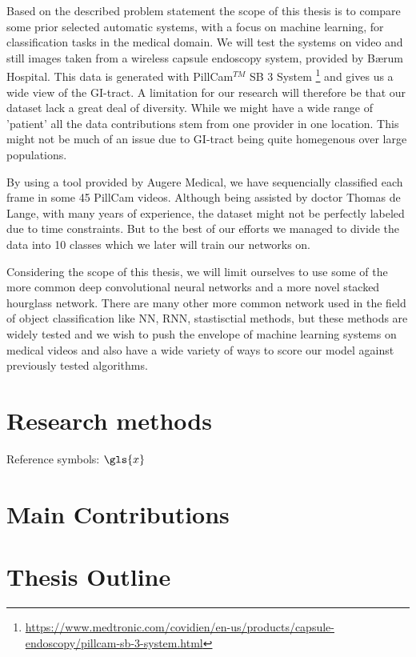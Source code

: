 \documentclass[thesis.tex]{subfiles}
\begin{document}
Based on the described problem statement the scope of this thesis is to compare some prior selected automatic systems, with a focus on machine learning, for classification tasks in the medical domain. We will test the systems on video and still images taken from a wireless capsule endoscopy system, provided by Bærum Hospital. This data is generated with PillCam$^{TM}$ SB 3 System \footnote{\url{https://www.medtronic.com/covidien/en-us/products/capsule-endoscopy/pillcam-sb-3-system.html}} and gives us a wide view of the GI-tract. A limitation for our research will therefore be that our dataset lack a great deal of diversity. While we might have a wide range of 'patient' all the data contributions stem from one provider in one location. This might not be much of an issue due to GI-tract being quite homegenous over large populations. 

By using a tool provided by Augere Medical, we have sequencially classified each frame in some 45 PillCam videos. Although being assisted by doctor Thomas de Lange, with many years of experience, the dataset might not be perfectly labeled due to time constraints. But to the best of our efforts we managed to divide the data into 10 classes which we later will train our networks on.

Considering the scope of this thesis, we will limit ourselves to use some of the more common deep convolutional neural networks and a more novel stacked hourglass network. There are many other more common network used in the field of object classification like NN, RNN, stastisctial methods, but these methods are widely tested and we wish to push the envelope of machine learning systems on medical videos and also have a wide variety of ways to score our model against previously tested algorithms.


\section{Research methods} \label{research_methods}
Reference symbols: $\gls{x}$

\section{Main Contributions} \label{main_contributions}


\section{Thesis Outline} \label{thesis_outline}
\end{document}
